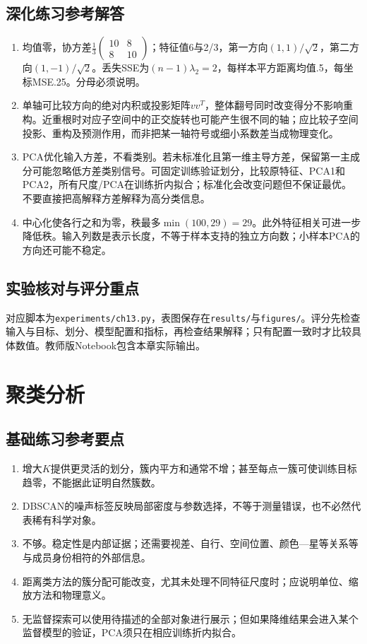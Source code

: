 \section*{深化练习参考解答}
\begin{enumerate}[label=D\arabic*.]
\item 均值零，协方差$\frac13\left(\begin{smallmatrix}10&8\\8&10\end{smallmatrix}\right)$；特征值6与2/3，第一方向$(1,1)/\sqrt2$，第二方向$(1,-1)/\sqrt2$。丢失SSE为$(n-1)\lambda_2=2$，每样本平方距离均值.5，每坐标MSE.25。分母必须说明。
\item 单轴可比较方向的绝对内积或投影矩阵$vv^T$，整体翻号同时改变得分不影响重构。近重根时对应子空间中的正交旋转也可能产生很不同的轴；应比较子空间投影、重构及预测作用，而非把某一轴符号或细小系数差当成物理变化。
\item PCA优化输入方差，不看类别。若未标准化且第一维主导方差，保留第一主成分可能忽略低方差类别信号。可固定训练验证划分，比较原特征、PCA1和PCA2，所有尺度/PCA在训练折内拟合；标准化会改变问题但不保证最优。不要直接把高解释方差解释为高分类信息。
\item 中心化使各行之和为零，秩最多$\min(100,29)=29$。此外特征相关可进一步降低秩。输入列数是表示长度，不等于样本支持的独立方向数；小样本PCA的方向还可能不稳定。
\end{enumerate}

\section*{实验核对与评分重点}
对应脚本为\texttt{experiments/ch13.py}，表图保存在\texttt{results/}与\texttt{figures/}。评分先检查输入与目标、划分、模型配置和指标，再检查结果解释；只有配置一致时才比较具体数值。教师版Notebook包含本章实际输出。

\chapter{聚类分析}
\section*{基础练习参考要点}
\begin{enumerate}[label=\arabic*.]
\item 增大$K$提供更灵活的划分，簇内平方和通常不增；甚至每点一簇可使训练目标趋零，不能据此证明自然簇数。
\item DBSCAN的噪声标签反映局部密度与参数选择，不等于测量错误，也不必然代表稀有科学对象。
\item 不够。稳定性是内部证据；还需要视差、自行、空间位置、颜色—星等关系等与成员身份相符的外部信息。
\item 距离类方法的簇分配可能改变，尤其未处理不同特征尺度时；应说明单位、缩放方法和物理意义。
\item 无监督探索可以使用待描述的全部对象进行展示；但如果降维结果会进入某个监督模型的验证，PCA须只在相应训练折内拟合。
\end{enumerate}
